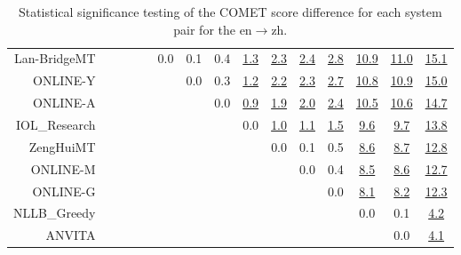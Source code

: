 \documentclass[11pt]{article}
\begin{document}
\begin{sidewaystable}
\begin{center}
{\begin{tabular}{rcccccccccccccc}
Lan-BridgeMT   &  &  &  &  & \cellcolor{red!0} 0.0 & \cellcolor{red!0} 0.1 & \cellcolor{red!30} 0.4 & \cellcolor{red!70} \underline{1.3} & \cellcolor{red!70} \underline{2.3} & \cellcolor{red!70} \underline{2.4} & \cellcolor{red!70} \underline{2.8} & \cellcolor{red!70} \underline{10.9} & \cellcolor{red!70} \underline{11.0} & \cellcolor{red!70} \underline{15.1}\\ 
ONLINE-Y   &  &  &  &  &  & \cellcolor{red!0} 0.0 & \cellcolor{red!30} 0.3 & \cellcolor{red!70} \underline{1.2} & \cellcolor{red!70} \underline{2.2} & \cellcolor{red!70} \underline{2.3} & \cellcolor{red!70} \underline{2.7} & \cellcolor{red!70} \underline{10.8} & \cellcolor{red!70} \underline{10.9} & \cellcolor{red!70} \underline{15.0}\\ 
ONLINE-A   &  &  &  &  &  &  & \cellcolor{red!0} 0.0 & \cellcolor{red!70} \underline{0.9} & \cellcolor{red!70} \underline{1.9} & \cellcolor{red!70} \underline{2.0} & \cellcolor{red!70} \underline{2.4} & \cellcolor{red!70} \underline{10.5} & \cellcolor{red!70} \underline{10.6} & \cellcolor{red!70} \underline{14.7}\\ 
IOL\_Research   &  &  &  &  &  &  &  & \cellcolor{red!0} 0.0 & \cellcolor{red!70} \underline{1.0} & \cellcolor{red!70} \underline{1.1} & \cellcolor{red!70} \underline{1.5} & \cellcolor{red!70} \underline{9.6} & \cellcolor{red!70} \underline{9.7} & \cellcolor{red!70} \underline{13.8}\\ 
ZengHuiMT   &  &  &  &  &  &  &  &  & \cellcolor{red!0} 0.0 & \cellcolor{red!0} 0.1 & \cellcolor{red!60} 0.5 & \cellcolor{red!70} \underline{8.6} & \cellcolor{red!70} \underline{8.7} & \cellcolor{red!70} \underline{12.8}\\ 
ONLINE-M   &  &  &  &  &  &  &  &  &  & \cellcolor{red!0} 0.0 & \cellcolor{red!20} 0.4 & \cellcolor{red!70} \underline{8.5} & \cellcolor{red!70} \underline{8.6} & \cellcolor{red!70} \underline{12.7}\\ 
ONLINE-G   &  &  &  &  &  &  &  &  &  &  & \cellcolor{red!0} 0.0 & \cellcolor{red!70} \underline{8.1} & \cellcolor{red!70} \underline{8.2} & \cellcolor{red!70} \underline{12.3}\\ 
NLLB\_Greedy   &  &  &  &  &  &  &  &  &  &  &  & \cellcolor{red!0} 0.0 & \cellcolor{red!0} 0.1 & \cellcolor{red!70} \underline{4.2}\\ 
ANVITA &    &  &  &  &  &  &  &  &  &  &  &  & \cellcolor{red!0} 0.0 & \cellcolor{red!70} \underline{4.1}\\ 
\bottomrule 
\end{tabular} }
\caption{Statistical significance testing of the COMET score difference for each system pair for the en$\rightarrow$zh.} 
 \end{center} \end{sidewaystable} 



\clearpage




\end{document}

